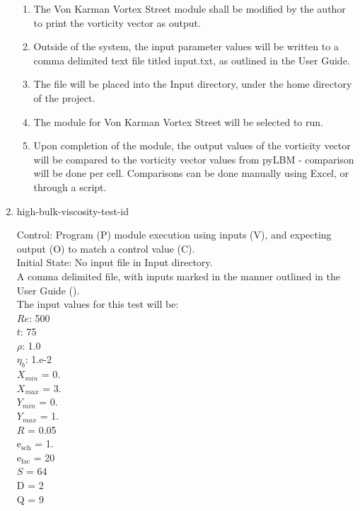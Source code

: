 \documentclass[12pt, titlepage]{article}
\newcounter{testcounter} %
\begin{document}
\begin{enumerate}
\begin{enumerate}
\item The Von Karman Vortex Street module shall be modified by the author to
  print the vorticity vector as output.
\item Outside of the system, the input parameter values will be written to a
  comma delimited text file titled input.txt, as outlined in the User Guide.
\item The file will be placed into the Input directory, under the home directory of the project.
\item The module for Von Karman Vortex Street will be selected to run.
\item Upon completion of the module, the output values of the vorticity vector
  will be compared to the vorticity vector values from pyLBM - comparison will
  be done per cell. Comparisons can be done manually using Excel, or through a
  script.
\end{enumerate}

\item{high-bulk-viscosity-test-id\thetestcounter \\}

Control: Program (P) module execution using inputs (V), and expecting output (O) to match a control value (C).\\
					
Initial State: No input file in Input directory.\\
					
A comma delimited file, with inputs marked in the manner outlined in the User
Guide (\citet{LBM_UserGuide_PM}).\\The input values for this test will be:\\
$Re$: 500\\
$t$: 75\\
$\rho$: 1.0\\
$\eta_b$: 1.e-2\\
$X_{min}$ = 0.\\
$X_{max}$ = 3.\\
$Y_{min}$ = 0.\\
$Y_{max}$ = 1.\\
$R$ = 0.05\\
$\mathrm{e_{sch}}$ = 1.\\
$\mathrm{e_{fac}}$ = 20\\
$S$ = 64\\
$\mathrm{D}$ = 2\\
$\mathrm{Q}$ = 9\\


\end{enumerate}
\end{document}
